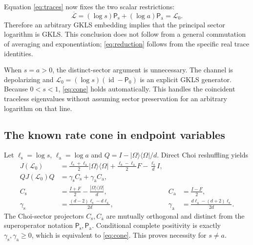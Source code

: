 \documentclass[11pt]{article}
\newcommand{\id}{\operatorname{id}}
\newcommand{\Ps}{\mathsf{P}_{\mathrm{s}}}
\newcommand{\Pa}{\mathsf{P}_{\mathrm{a}}}
\newcommand{\Pz}{\mathsf{P}_{0}}
\newcommand{\gs}{\gamma_{\mathrm{s}}}
\newcommand{\ga}{\gamma_{\mathrm{a}}}
\begin{document}
Equation \eqref{eq:traces} now fixes the two scalar restrictions:
\begin{equation}
       \overline{\mathcal L}=(\log s)\Ps+(\log a)\Pa
       =\mathcal L_0.                              \label{eq:reduction}
\end{equation}
Therefore an arbitrary GKLS embedding implies that the principal sector
logarithm is GKLS. This conclusion does not follow from a general
commutation of averaging and exponentiation; \eqref{eq:reduction} follows
from the specific real trace identities.

When $s=a>0$, the distinct-sector argument is unnecessary. The channel is
depolarizing and
$\mathcal L_0=(\log s)(\id-\Pz)$ is an explicit GKLS generator.
Because $0<s<1$, \eqref{eq:cone} holds automatically. This handles the
coincident traceless eigenvalues without assuming sector preservation for
an arbitrary logarithm on that line.

\subsection{The known rate cone in endpoint variables}

Let $\ell_{\mathrm{s}}=\log s$, $\ell_{\mathrm{a}}=\log a$ and
$Q=I-|\Omega\rangle\langle\Omega|/d$. Direct Choi reshuffling yields
\begin{align}
 J(\mathcal L_0)
 &=\frac{\ell_{\mathrm{s}}+\ell_{\mathrm{a}}}{2}
       |\Omega\rangle\langle\Omega|
   +\frac{\ell_{\mathrm{s}}-\ell_{\mathrm{a}}}{2}F
   -\frac{\ell_{\mathrm{s}}}{d}I, \nonumber\\
 QJ(\mathcal L_0)Q&=\gs C_{\mathrm{s}}+\ga C_{\mathrm{a}},       \label{eq:ccp}\\
 C_{\mathrm{s}}&=\frac{I+F}{2}
                   -\frac{|\Omega\rangle\langle\Omega|}{d},
 &C_{\mathrm{a}}&=\frac{I-F}{2},\nonumber\\
 \gs&=\frac{(d-2)\ell_{\mathrm{s}}-d\ell_{\mathrm{a}}}{2d},
 &\ga&=\frac{d\ell_{\mathrm{a}}-(d+2)\ell_{\mathrm{s}}}{2d}.
                                                               \label{eq:rates}
\end{align}
The Choi-sector projectors $C_{\mathrm{s}},C_{\mathrm{a}}$ are mutually
orthogonal and distinct from the superoperator notation
$\Ps,\Pa$. Conditional complete positivity is exactly
$\gs,\ga\geq0$, which is equivalent to \eqref{eq:cone}.
This proves necessity for $s\ne a$.
\end{document}

